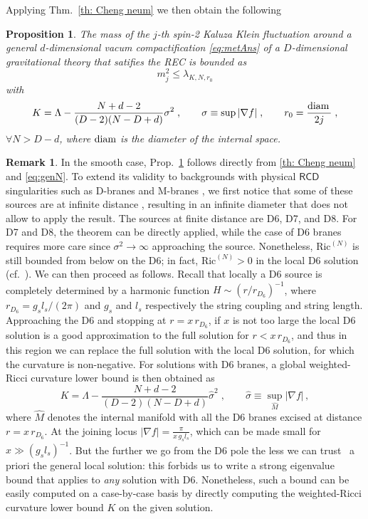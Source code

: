 \documentclass[12pt]{article}
\newcommand{\diam}{{\rm{diam\,}}}
\newcommand{\RCD}{\mathsf{RCD}}
\theoremstyle{plain}
\newtheorem{proposition}[lemma]{Proposition}
\theoremstyle{definition}
\newtheorem{remark}[lemma]{Remark}
\begin{document}
Applying Thm.~\ref{th: Cheng neum}  we then obtain the following
\begin{proposition}\label{prop:kk}
	The mass of the $j$-th spin-2 Kaluza Klein fluctuation around a general $d$-dimensional vacum compactification \eqref{eq:metAns} of a $D$-dimensional gravitational theory that satifies the REC is bounded as
	\begin{equation}\label{eq:eq-prop}
		m^2_j \leqslant \lambda_{K, N, r_0}
	\end{equation}
	with
	\begin{equation}
		K = \Lambda-\frac{N + d-2}{(D-2)(N-D+d)}\sigma^2\;, \qquad \sigma \equiv \sup{|\nabla f|}\;,\qquad r_0 = \frac{\diam}{2j}\;,
	\end{equation}
	$\forall N > D-d$, where $\rm{diam}$ is the diameter of the internal space.
\end{proposition}
\begin{remark}
	In the smooth case, Prop.~\ref{prop:kk} follows directly from \eqref{th: Cheng neum} and \eqref{eq:genN}. To extend its validity to backgrounds with physical $\RCD$ singularities such as D-branes and M-branes \cite{deluca-deponti-mondino-t,deluca-deponti-mondino-t-entropy}, we first notice that some of these sources are at infinite distance \cite[Table 1]{deluca-deponti-mondino-t}, resulting in an infinite diameter that does not allow to apply the result. The sources at finite distance are D6, D7, and D8. For D7 and D8, the theorem can be directly applied, while the case of D6 branes requires more care since $\sigma^2 \to \infty$ approaching the source. Nonetheless, $\text{Ric}^{(N)}$ is still bounded from below on the D6; in fact, $\text{Ric}^{(N)} > 0$ in the local D6 solution (cf.~\cite[Sec.~2.2]{deluca-deponti-mondino-t}).
	We can then proceed as follows. Recall that locally a D6 source is completely determined by a harmonic function $H \sim (r/r_{D_6})^{-1}$, where $r_{D_6} = g_s l_s/(2\pi)$ and $g_s$ and $l_s$ respectively the string coupling and string length. Approaching the D6 and stopping at $r = x\,  r_{D_6}$, if $x$ is not too large the local D6 solution is a good approximation to the full solution for $r< x\, r_{D_6}$, and thus in this region we can replace the full solution with the local D6 solution, for which the curvature is non-negative. For solutions with D6 branes, a global weighted-Ricci curvature lower bound is then obtained as
	\begin{equation}
		K = \Lambda-\frac{N + d-2}{(D-2)(N-D+d)}\hat{\sigma}^2\;, \qquad \hat \sigma \equiv \sup_{\hat{M}}{|\nabla f|\,,}
	\end{equation}
	where $\hat M$ denotes the internal manifold with all the D6 branes excised at distance $r = x\, r_{D_6}$. At the joining locus $|\nabla f| = \frac{\pi}{x\, g_s l_s}$, which can be made small for $x \gg (g_s l_s)^{-1}$. But the further we go from the D6 pole the less we can trust \ a priori the general local solution: this forbids us to write a strong eigenvalue bound that applies to \emph{any} solution with D6. Nonetheless, such a bound can be easily computed on a case-by-case basis by directly computing the weighted-Ricci curvature lower bound $K$ on the given solution.

\end{remark}
\end{document}
